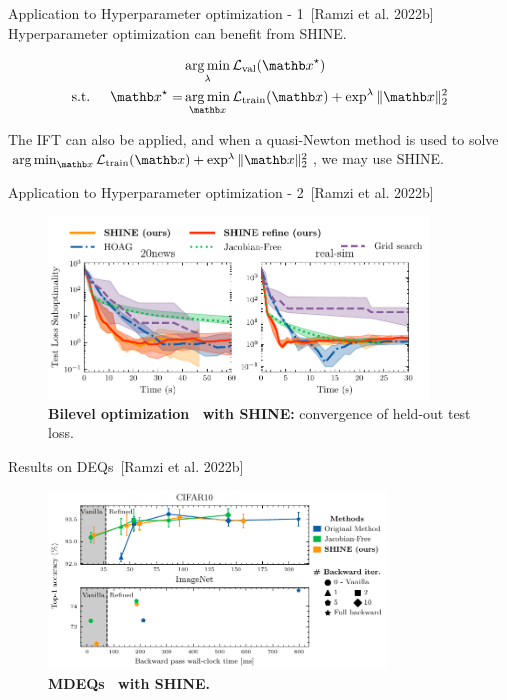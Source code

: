 \begin{frame}{Application to Hyperparameter optimization - 1~[Ramzi et al. 2022b]}
    Hyperparameter optimization can benefit from SHINE.

    \begin{equation*}
        \begin{split}
            &\argmin_{\lambda} \mathcal{L}_{\text{val}}(\xb^\star)\\
            \text{s.t. } \quad \xb^\star = &\argmin_{\xb} \mathcal{L}_{\text{train}}(\xb) + \exp^{\lambda} \|\xb\|_2^2
        \end{split}
    \end{equation*}

    \pause
    The IFT can also be applied, and when a quasi-Newton method is used to solve $\argmin_{\xb} \mathcal{L}_{\text{train}}(\xb) + \exp^{\lambda} \|\xb\|_2^2$, we may use SHINE.
\end{frame}

\begin{frame}{Application to Hyperparameter optimization - 2~[Ramzi et al. 2022b]}
    \begin{figure}
        \centering
        \includegraphics[width=0.9\textwidth]{Figures/shine_figures/bilevel_test.pdf}
        \caption{\textbf{Bilevel optimization~\citep{Pedregosa2016HyperparameterGradient} with SHINE:} convergence of held-out test loss.}
    \end{figure}

\end{frame}

\begin{frame}{Results on DEQs~[Ramzi et al. 2022b]}
    \begin{figure}
        \centering
        \includegraphics[width=0.8\textwidth]{Figures/shine_figures/merged_results_latency_style.pdf}
        \caption{\textbf{MDEQs~\citep{Bai2020MultiscaleModels} with SHINE.}}
    \end{figure}
\end{frame}

